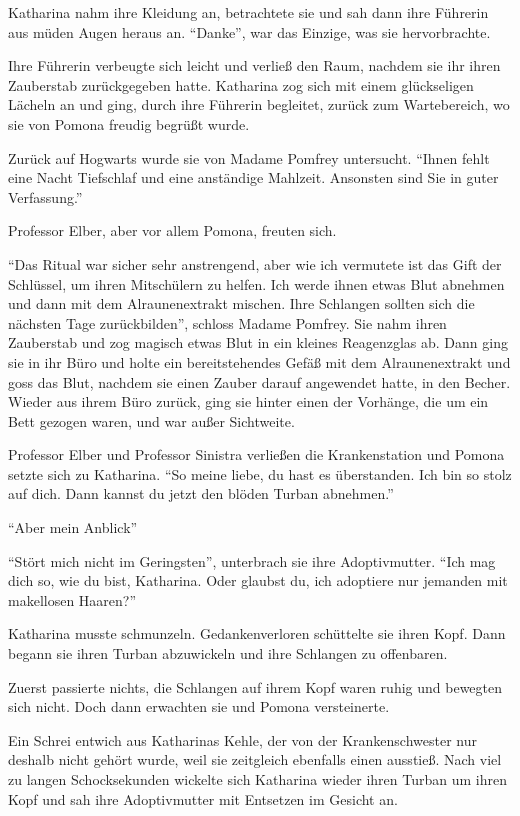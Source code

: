 Katharina nahm ihre Kleidung an, betrachtete sie und sah dann ihre Führerin aus müden Augen heraus an. \enquote{Danke}, war das Einzige, was sie hervorbrachte.

Ihre Führerin verbeugte sich leicht und verließ den Raum, nachdem sie ihr ihren Zauberstab zurückgegeben hatte. Katharina zog sich mit einem glückseligen Lächeln an und ging, durch ihre Führerin begleitet, zurück zum Wartebereich, wo sie von Pomona freudig begrüßt wurde.


Zurück auf Hogwarts wurde sie von Madame Pomfrey untersucht. \enquote{Ihnen fehlt eine Nacht Tiefschlaf und eine anständige Mahlzeit. Ansonsten sind Sie in guter Verfassung.}

Professor Elber, aber vor allem Pomona, freuten sich.

\enquote{Das Ritual war sicher sehr anstrengend, aber wie ich vermutete ist das Gift der Schlüssel, um ihren Mitschülern zu helfen. Ich werde ihnen etwas Blut abnehmen und dann mit dem Alraunenextrakt mischen. Ihre Schlangen sollten sich die nächsten Tage zurückbilden}, schloss Madame Pomfrey.
Sie nahm ihren Zauberstab und zog magisch etwas Blut in ein kleines Reagenzglas ab. Dann ging sie in ihr Büro und holte ein bereitstehendes Gefäß mit dem Alraunenextrakt und goss das Blut, nachdem sie einen Zauber darauf angewendet hatte, in den Becher. Wieder aus ihrem Büro zurück, ging sie hinter einen der Vorhänge, die um ein Bett gezogen waren, und war außer Sichtweite.

Professor Elber und Professor Sinistra verließen die Krankenstation und Pomona setzte sich zu Katharina. \enquote{So meine liebe, du hast es überstanden. Ich bin so stolz auf dich. Dann kannst du jetzt den blöden Turban abnehmen.}

\enquote{Aber mein Anblick\abs}

\enquote{Stört mich nicht im Geringsten}, unterbrach sie ihre Adoptivmutter. \enquote{Ich mag dich so, wie du bist, Katharina. Oder glaubst du, ich adoptiere nur jemanden mit makellosen Haaren?}

Katharina musste schmunzeln. Gedankenverloren schüttelte sie ihren Kopf. Dann begann sie ihren Turban abzuwickeln und ihre Schlangen zu offenbaren.

Zuerst passierte nichts, die Schlangen auf ihrem Kopf waren ruhig und bewegten sich nicht. Doch dann erwachten sie und Pomona versteinerte.

Ein Schrei entwich aus Katharinas Kehle, der von der Krankenschwester nur deshalb nicht gehört wurde, weil sie zeitgleich ebenfalls einen ausstieß. Nach viel zu langen Schocksekunden wickelte sich Katharina wieder ihren Turban um ihren Kopf und sah ihre Adoptivmutter mit Entsetzen im Gesicht an.

